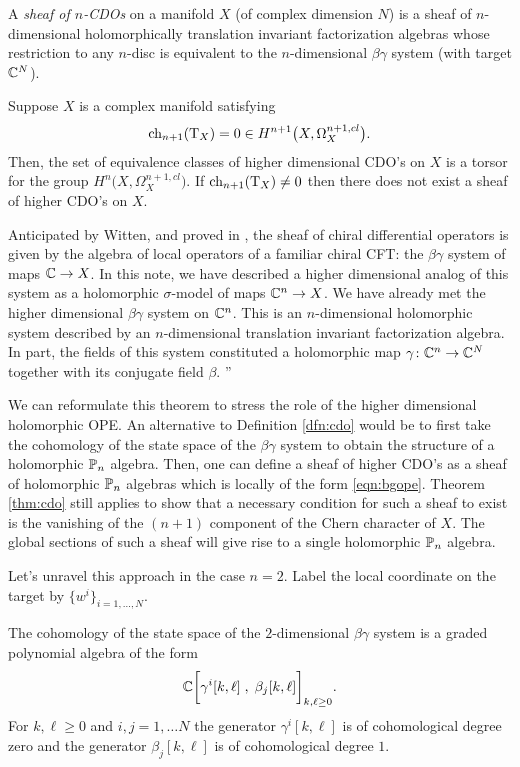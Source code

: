 \documentclass[11pt]{amsart}
\begin{document}
\begin{dfn}\label{dfn:cdo}
A {\em sheaf of $n$-CDOs} on a manifold $X$ (of complex dimension $N$) is a sheaf of $n$-dimensional holomorphically translation invariant factorization algebras whose restriction to any $n$-disc is equivalent to the $n$-dimensional $\beta\gamma$ system (with target $\mathbb C^N$). 
\end{dfn}

\begin{thm}\label{thm:cdo}
Suppose $X$ is a complex manifold satisfying 
\[
{\rm ch}_{n+1} ({\rm T}_X) = 0 \in H^{n+1} \big(X , \Omega^{n+1,cl}_X\big).
\]
Then, the set of equivalence classes of higher dimensional CDO's on $X$ is a torsor for the group $H^n \big(X , \Omega^{n+1, cl}_X\big)$. 
If ${\rm ch}_{n+1}({\rm T}_X) \ne 0$ then there does not exist a sheaf of higher CDO's on $X$. 
\end{thm}

Anticipated by Witten, and proved in \cite{GGW}, the sheaf of chiral differential operators is given by the algebra of local operators of a familiar chiral CFT: the $\beta\gamma$ system of maps $\mathbb C \to X$.
In this note, we have described a higher dimensional analog of this system as a holomorphic $\sigma$-model of maps $\mathbb C^n \to X$. 
We have already met the higher dimensional $\beta\gamma$ system on $\mathbb C^n$.
This is an $n$-dimensional holomorphic system described by an $n$-dimensional translation invariant factorization algebra.
In part, the fields of this system constituted a holomorphic map $\gamma \colon \mathbb C^n \to \mathbb C^N$ together with its conjugate field $\beta$. ''

We can reformulate this theorem to stress the role of the higher dimensional holomorphic OPE. 
An alternative to Definition \ref{dfn:cdo} would be to first take the cohomology of the state space of the $\beta\gamma$ system to obtain the structure of a holomorphic $\mathbb P_n$ algebra.
Then, one can define a sheaf of higher CDO's as a sheaf of holomorphic $\mathbb P_n$ algebras which is locally of the form \eqref{eqn:bgope}. 
Theorem \ref{thm:cdo} still applies to show that a necessary condition for such a sheaf to exist is the vanishing of the $(n+1)$ component of the Chern character of $X$. 
The global sections of such a sheaf will give rise to a single holomorphic $\mathbb P_n$ algebra. 


Let's unravel this approach in the case $n=2$. 
Label the local coordinate on the target by $\{w^i\}_{i=1,\ldots,N}$. 

The cohomology of the state space of the $2$-dimensional $\beta\gamma$ system is a graded polynomial algebra of the form
\[
\mathbb C\bigg[\gamma^i[k,\ell] \; , \; \beta_j [k,\ell] \bigg]_{k,\ell \geq 0} .
\]
For $k,\ell \geq 0$ and $i,j=1,\ldots N$ the generator $\gamma^i[k,\ell]$ is of cohomological degree zero and the generator $\beta_j[k,\ell]$ is of cohomological degree $1$.
\end{document}

